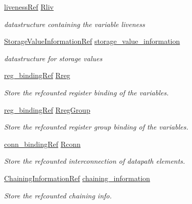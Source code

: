 \begin{DoxyCompactItemize}
\hyperlink{liveness_8hpp_ac56034a0c324ba3e860802f126f7793f}{liveness\+Ref} \hyperlink{classhls_a2b30e1faa6160eb82d63a10c8cfe2007}{Rliv}
\begin{DoxyCompactList}\small\item\em datastructure containing the variable liveness \end{DoxyCompactList}\item 
\hyperlink{storage__value__information_8hpp_a9a4a3df6cd31ca08bb2a497f8944ca34}{Storage\+Value\+Information\+Ref} \hyperlink{classhls_a513ceea78f0966ebd6080121fc717296}{storage\+\_\+value\+\_\+information}
\begin{DoxyCompactList}\small\item\em datastructure for storage values \end{DoxyCompactList}\item 
\hyperlink{reg__binding_8hpp_aa41bd7902f9f054af782503a16789fd2}{reg\+\_\+binding\+Ref} \hyperlink{classhls_acde7b0e5735648a52b1e3c719f1c9d6e}{Rreg}
\begin{DoxyCompactList}\small\item\em Store the refcounted register binding of the variables. \end{DoxyCompactList}\item 
\hyperlink{reg__binding_8hpp_aa41bd7902f9f054af782503a16789fd2}{reg\+\_\+binding\+Ref} \hyperlink{classhls_a4b08c33d2bcb4c34a0fcdd77b0d94a49}{Rreg\+Group}
\begin{DoxyCompactList}\small\item\em Store the refcounted register group binding of the variables. \end{DoxyCompactList}\item 
\hyperlink{conn__binding_8hpp_a074d084f1d6f4503d815ba91304264a0}{conn\+\_\+binding\+Ref} \hyperlink{classhls_a2ba012fee9c8ddef38580fc8ed944b4c}{Rconn}
\begin{DoxyCompactList}\small\item\em Store the refcounted interconnection of datapath elements. \end{DoxyCompactList}\item 
\hyperlink{chaining__information_8hpp_ae1c1aca3d4b334cf7313b4c7fe6a283c}{Chaining\+Information\+Ref} \hyperlink{classhls_a3928ee165cc11cc67e8e88689282dbb9}{chaining\+\_\+information}
\begin{DoxyCompactList}\small\item\em Store the refcounted chaining info. \end{DoxyCompactList}\item 

\end{DoxyCompactItemize}

